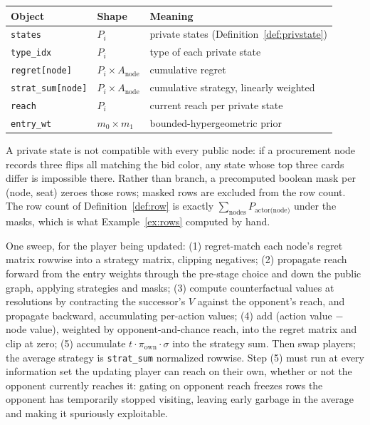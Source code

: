 \documentclass[11pt]{article}
\theoremstyle{plain}
\theoremstyle{definition}
\theoremstyle{remark}
\newcommand{\code}[1]{\texttt{\small #1}}
\begin{document}
\begin{center}\small
\begin{tabular}{@{}lll@{}}
\toprule
Object & Shape & Meaning\\
\midrule
\code{states} & $P_i$ & private states (Definition~\ref{def:privstate})\\
\code{type\_idx} & $P_i$ & type of each private state\\
\code{regret[node]} & $P_i \times A_{\text{node}}$ & cumulative regret\\
\code{strat\_sum[node]} & $P_i \times A_{\text{node}}$ & cumulative strategy, linearly weighted\\
\code{reach} & $P_i$ & current reach per private state\\
\code{entry\_wt} & $m_0\times m_1$ & bounded-hypergeometric prior\\
\bottomrule
\end{tabular}
\end{center}

A private state is not compatible with every public node: if a procurement node
records three flips all matching the bid color, any state whose top three cards
differ is impossible there. Rather than branch, a precomputed boolean mask per
(node, seat) zeroes those rows; masked rows are excluded from the row count. The
row count of Definition~\ref{def:row} is exactly $\sum_{\text{nodes}}
P_{\text{actor(node)}}$ under the masks, which is what Example~\ref{ex:rows}
computed by hand.

One sweep, for the player being updated: (1) regret-match each node's regret
matrix rowwise into a strategy matrix, clipping negatives; (2) propagate reach
forward from the entry weights through the pre-stage choice and down the public
graph, applying strategies and masks; (3) compute counterfactual values at
resolutions by contracting the successor's $V$ against the opponent's reach, and
propagate backward, accumulating per-action values; (4) add (action value $-$
node value), weighted by opponent-and-chance reach, into the regret matrix and
clip at zero; (5) accumulate $t\cdot\pi_{\mathrm{own}}\cdot\sigma$ into the
strategy sum. Then swap players; the average strategy is \code{strat\_sum}
normalized rowwise. Step (5) must run at every information set the updating
player can reach on their own, whether or not the opponent currently reaches it:
gating on opponent reach freezes rows the opponent has temporarily stopped
visiting, leaving early garbage in the average and making it spuriously
exploitable.
\end{document}
